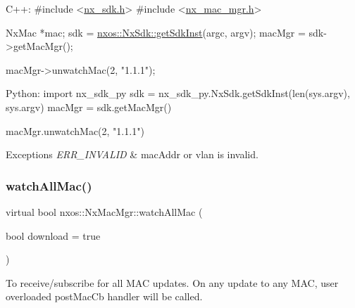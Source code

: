 \begin{DoxyCode}
C++:
\textcolor{preprocessor}{     #include <\mbox{\hyperlink{nx__sdk_8h}{nx\_sdk.h}}>}
\textcolor{preprocessor}{     #include <\mbox{\hyperlink{nx__mac__mgr_8h}{nx\_mac\_mgr.h}}>}

     NxMac *mac;
     sdk = \mbox{\hyperlink{classnxos_1_1_nx_sdk_a5050e2d26c40744b4fc7862068a83f39}{nxos::NxSdk::getSdkInst}}(argc, argv);
     macMgr = sdk->getMacMgr();

     macMgr->unwatchMac(2, \textcolor{stringliteral}{"1.1.1"});

Python:
     \textcolor{keyword}{import} nx\_sdk\_py
     sdk = nx\_sdk\_py.NxSdk.getSdkInst(len(sys.argv), sys.argv)
     macMgr = sdk.getMacMgr()

     macMgr.unwatchMac(2, \textcolor{stringliteral}{"1.1.1"})
\end{DoxyCode}



\begin{DoxyExceptions}{Exceptions}
{\em E\+R\+R\+\_\+\+I\+N\+V\+A\+L\+ID} & mac\+Addr or vlan is invalid. \\
\hline
\end{DoxyExceptions}
\mbox{\label{classnxos_1_1_nx_mac_mgr_a5f4d2d56e21e3ae39969fa67774779d8}} 
\subsubsection{\texorpdfstring{watch\+All\+Mac()}{watchAllMac()}}
{\footnotesize\ttfamily virtual bool nxos\+::\+Nx\+Mac\+Mgr\+::watch\+All\+Mac (\begin{DoxyParamCaption}\item[{bool}]{download = {\ttfamily true} }\end{DoxyParamCaption})\hspace{0.3cm}{\ttfamily [pure virtual]}}

To receive/subscribe for all M\+AC updates. On any update to any M\+AC, user overloaded post\+Mac\+Cb handler will be called.


